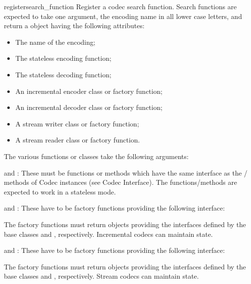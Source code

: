 \begin{funcdesc}{register}{search_function}
Register a codec search function. Search functions are expected to
take one argument, the encoding name in all lower case letters, and
return a  object having the following attributes:

\begin{itemize}
  \item {} The name of the encoding;
  \item {} The stateless encoding function;
  \item {} The stateless decoding function;
  \item {} An incremental encoder class or factory function;
  \item {} An incremental decoder class or factory function;
  \item {} A stream writer class or factory function;
  \item {} A stream reader class or factory function.
\end{itemize}

The various functions or classes take the following arguments:

   and : These must be functions or methods
  which have the same interface as the
  / methods of Codec instances (see
  Codec Interface). The functions/methods are expected to work in a
  stateless mode.

   and : These have to be
  factory functions providing the following interface:


  The factory functions must return objects providing the interfaces
  defined by the base classes  and
  , respectively. Incremental codecs can maintain
  state.

   and : These have to be
  factory functions providing the following interface:


  The factory functions must return objects providing the interfaces
  defined by the base classes  and
  , respectively. Stream codecs can maintain
  state.


\end{funcdesc}
